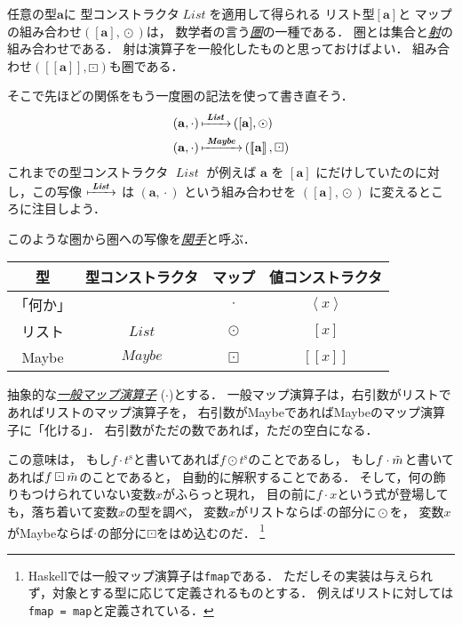 \documentclass[a4paper,draft]{jsbook}
\def\[{\left[\!\left[}
\def\]{\right]\!\right]}
\newcommand{\programminglanguage}[1]{\textsf{#1}}
\newcommand{\haskell}{\programminglanguage{Haskell}}
\newcommand{\keyword}[1]{{\underline{\emph{#1}}}}
\newcommand{\code}[1]{\texttt{#1}}
\newcommand{\mType}[1]{\mathbf{#1}}
\newcommand{\mListType}[1]{[\mType{#1}]}
\newcommand{\mMaybeType}[1]{\[\mType{#1}\]}
\newcommand{\mFunctor}[1]{\textit{\textbf{#1}}}
\newcommand{\mTypeConstructor}[1]{\mathit{#1}} %
\newcommand{\mTupleWith}[1]{\left(#1\right)}
\newcommand{\mList}[1]{{#1}^\mathrm{s}}
\DeclareMathOperator{\mMap}{\cdot}
\DeclareMathOperator{\mMapList}{\odot}
\DeclareMathOperator{\mMapMaybe}{\boxdot}
\DeclareMathOperator{\mListTypeConstructor}{\mTypeConstructor{List}}
\DeclareMathOperator{\mListFunctor}{\mFunctor{List}}
\DeclareMathOperator{\mMaybeFunctor}{\mFunctor{Maybe}}
\DeclareMathOperator{\mListProjection}{\xmapsto{\;\mListFunctor\;}}
\DeclareMathOperator{\mMaybeProjection}{\xmapsto{\;\mMaybeFunctor\;}}
\newcommand{\mathTypeParameter}[1]{\mathbf{#1}}
\newcommand{\mathTypeConstructor}[1]{\mathit{#1}} %
\newcommand{\mathMaybeVar}[1]{\Tilde{#1}}
\newcommand{\mathListWith}[1]{\left[#1\right]}
\newcommand{\mathMaybeWith}[1]{\[#1\]}
\newcommand{\mathPureWith}[1]{\left\langle#1\right\rangle}
\newcommand{\mathMaybeType}[1]{\mathMaybeWith{\mathTypeParameter{#1}}}
\DeclareMathOperator{\mathList}{\mathTypeConstructor{List}}
\DeclareMathOperator{\mathMaybe}{\mathTypeConstructor{Maybe}}
\newcommand{\mathGeneralMap}{\mathbin{\cdot}}
\newcommand{\mathMaybeMap}{\mathbin{\boxdot}}
\begin{document}
任意の型$\mathTypeParameter{a}$に
型コンストラクタ$\mathList$を適用して得られる
リスト型$\mListType{a}$と
マップの組み合わせ$\mTupleWith{\mListType{a},\mMapList}$は，
数学者の言う\keyword{圏}の一種である．
圏とは集合と\keyword{射}の組み合わせである．
射は演算子を一般化したものと思っておけばよい．
組み合わせ$\mTupleWith{\mathMaybeType{a},\mathMaybeMap}$も圏である．

そこで先ほどの関係をもう一度圏の記法を使って書き直そう．
\begin{align}
\mTupleWith{\mType{a},\mMap}
&\mListProjection\mTupleWith{\mListType{a},\mMapList}\\
\mTupleWith{\mType{a},\mMap}
&\mMaybeProjection\mTupleWith{\mMaybeType{a},\mMapMaybe}
\end{align}
これまでの型コンストラクタ $\mListTypeConstructor$ が例えば $\mType{a}$ を $\mListType{a}$ にだけしていたのに対し，この写像 $\mListProjection$ は $\mTupleWith{\mType{a},\mMap}$ という組み合わせを $\mTupleWith{\mListType{a},\mMapList}$ に変えるところに注目しよう．

このような圏から圏への写像を\keyword{関手}と呼ぶ．



\begin{table}
\begin{center}
\begin{tabular}{||c|c|c|c||}\hline
型&型コンストラクタ&マップ&値コンストラクタ\\\hline\hline
「何か」&&$\mathGeneralMap$&$\mathPureWith{x}$\\
リスト&$\mathList$&$\mMapList$&$\mathListWith{x}$\\
Maybe&$\mathMaybe$&$\mathMaybeMap$&$\mathMaybeWith{x}$\\\hline
\end{tabular}
\end{center}
\end{table}



抽象的な\keyword{一般マップ演算子} ($\mathGeneralMap$)とする．
一般マップ演算子は，右引数がリストであればリストのマップ演算子を，
右引数がMaybeであればMaybeのマップ演算子に「化ける」．
右引数がただの数であれば，ただの空白になる．

この意味は，
もし$f\mathGeneralMap\mList{t}$と書いてあれば$f\mMapList\mList{t}$のことであるし，
もし$f\mathGeneralMap\mathMaybeVar{m}$と書いてあれば$f\mathMaybeMap\mathMaybeVar{m}$のことであると，
自動的に解釈することである．
そして，何の飾りもつけられていない変数$x$がふらっと現れ，
目の前に$f\mathGeneralMap x$という式が登場しても，落ち着いて変数$x$の型を調べ，
変数$x$がリストならば$\mathGeneralMap$の部分に$\mMapList$を，
変数$x$がMaybeならば$\mathGeneralMap$の部分に$\mathMaybeMap$をはめ込むのだ．%
\footnote{\haskell では一般マップ演算子は\code{fmap}である．
ただしその実装は与えられず，対象とする型に応じて定義されるものとする．
例えばリストに対しては\code{fmap = map}と定義されている．}
\end{document}
